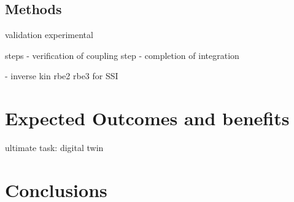 \documentclass[a4paper]{article}
\begin{document}
\subsection*{Methods}


validation experimental \cite{heathcote2008effect}

steps
- verification of coupling step
- completion of integration


- inverse kin rbe2 rbe3 for SSI






\section*{Expected Outcomes and benefits}


ultimate task: digital twin \cite{semeraro2021digital}


%

\section*{Conclusions}


\printbibliography
\end{document}
